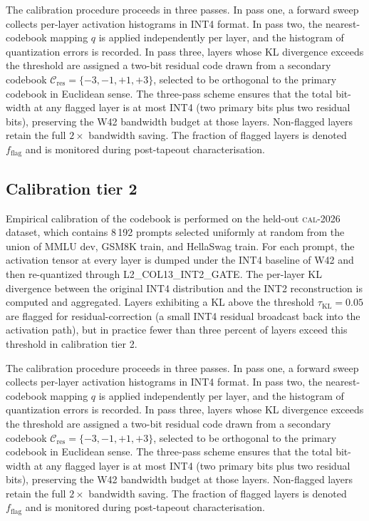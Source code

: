 The calibration procedure proceeds in three passes. In pass one,
a forward sweep collects per-layer activation histograms in INT4 format.
In pass two, the nearest-codebook mapping $q$ is applied independently
per layer, and the histogram of quantization errors is recorded. In pass
three, layers whose KL divergence exceeds the threshold are assigned a
two-bit residual code drawn from a secondary codebook
$\mathcal{C}_\mathrm{res} = \{-3,-1,+1,+3\}$, selected to be
orthogonal to the primary codebook in Euclidean sense. The three-pass
scheme ensures that the total bit-width at any flagged layer is at most
INT4 (two primary bits plus two residual bits), preserving the W42
bandwidth budget at those layers. Non-flagged layers retain the full
$2\times$ bandwidth saving. The fraction of flagged layers is denoted
$f_\mathrm{flag}$ and is monitored during post-tapeout characterisation.


\subsection{Calibration tier 2}

Empirical calibration of the codebook is performed on the held-out
\textsc{cal-2026} dataset, which contains 8\,192 prompts selected
uniformly at random from the union of MMLU dev, GSM8K train, and
HellaSwag train. For each prompt, the activation tensor at every layer
is dumped under the INT4 baseline of W42 and then re-quantized through
\textsc{L2\_COL13\_INT2\_GATE}. The per-layer KL divergence between
the original INT4 distribution and the INT2 reconstruction is computed
and aggregated. Layers exhibiting a KL above the threshold
$\tau_{\mathrm{KL}} = 0.05$ are flagged for residual-correction (a
small INT4 residual broadcast back into the activation path), but in
practice fewer than three percent of layers exceed this threshold in
calibration tier 2.

The calibration procedure proceeds in three passes. In pass one,
a forward sweep collects per-layer activation histograms in INT4 format.
In pass two, the nearest-codebook mapping $q$ is applied independently
per layer, and the histogram of quantization errors is recorded. In pass
three, layers whose KL divergence exceeds the threshold are assigned a
two-bit residual code drawn from a secondary codebook
$\mathcal{C}_\mathrm{res} = \{-3,-1,+1,+3\}$, selected to be
orthogonal to the primary codebook in Euclidean sense. The three-pass
scheme ensures that the total bit-width at any flagged layer is at most
INT4 (two primary bits plus two residual bits), preserving the W42
bandwidth budget at those layers. Non-flagged layers retain the full
$2\times$ bandwidth saving. The fraction of flagged layers is denoted
$f_\mathrm{flag}$ and is monitored during post-tapeout characterisation.


